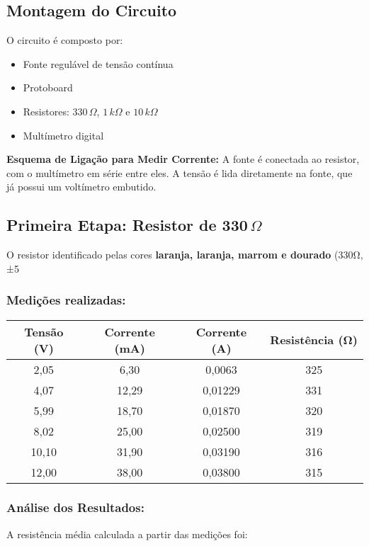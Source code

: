 \subsection{Montagem do Circuito}
O circuito é composto por:

\begin{itemize}
    \item Fonte regulável de tensão contínua
    \item Protoboard
    \item Resistores: $330\,\Omega$, $1\,k\Omega$ e $10\,k\Omega$
    \item Multímetro digital
\end{itemize}

\textbf{Esquema de Ligação para Medir Corrente:}
A fonte é conectada ao resistor, com o multímetro em série entre eles. A tensão é lida diretamente na fonte, que já possui um voltímetro embutido.

\subsection{Primeira Etapa: Resistor de 330\,$\Omega$}
O resistor identificado pelas cores \textbf{laranja, laranja, marrom e dourado} (330Ω, ±5%

\subsubsection{Medições realizadas:}

\begin{center}
\begin{tabular}{|c|c|c|c|}
\hline
\textbf{Tensão (V)} & \textbf{Corrente (mA)} & \textbf{Corrente (A)} & \textbf{Resistência (Ω)} \\
\hline
2,05 & 6,30 & 0,0063 & 325 \\
4,07 & 12,29 & 0,01229 & 331 \\
5,99 & 18,70 & 0,01870 & 320 \\
8,02 & 25,00 & 0,02500 & 319 \\
10,10 & 31,90 & 0,03190 & 316 \\
12,00 & 38,00 & 0,03800 & 315 \\
\hline
\end{tabular}
\end{center}

\subsubsection{Análise dos Resultados:}
A resistência média calculada a partir das medições foi:

